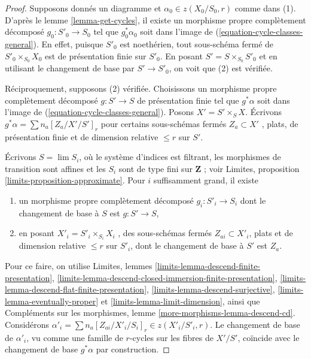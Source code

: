 \begin{proof} 
Supposons donnés un diagramme et $\alpha_0 \in z(X_0/S_0, r)$ comme dans (1). D'après
 le lemme \ref{lemma-get-cycles}, il existe un morphisme propre complètement 
décomposé  $g_0 : S'_0 \to S_0$  tel que $g_0^*\alpha_0$  soit 
dans l'image de (\ref{equation-cycle-classes-general}). En effet, puisque  
$S'_0$ est noethérien, tout sous-schéma fermé de  $S'_0 \times_{S_0} X_0$
  est de présentation finie sur  $S'_0$. En posant  $S' = S \times_{S_0} S'_0$
  et en utilisant le changement de base par $S' \to S'_0$, on voit que (2) est vérifiée. 

\medskip\noindent
 Réciproquement, supposons (2) vérifiée. Choisissons un morphisme propre complètement 
décomposé  $g : S' \to S$  de présentation finie tel que  $g^*\alpha$ soit dans 
l'image de (\ref{equation-cycle-classes-general}). Posons $X' = S' \times_S X$. 
Écrivons $g^*\alpha = \sum n_a [Z_a/X'/S']_r$  pour certains sous-schémas fermés  $Z_a \subset X'$
 , plats, de présentation finie et de dimension relative  
$\leq r$  sur  $S'$. 

\medskip\noindent
 Écrivons $S = \lim S_i$, où le système d'indices est filtrant, les morphismes de transition
 sont affines et les $S_i$ sont de type fini sur $\mathbf{Z}$ 
; voir Limites, proposition \ref{limits-proposition-approximate}.
 Pour $i$ suffisamment grand, il existe 
\begin{enumerate} 
\item un morphisme propre complètement décomposé  $g_i : S'_i \to S_i$
  dont le changement de base à  $S$  est  $g : S' \to S$, 
\item en posant $X'_i = S'_i \times_{S_i} X_i$
 , des sous-schémas fermés $Z_{ai} \subset X'_i$, plats et de
 dimension relative $\leq r$ sur $S'_i$, dont le changement de base à $S'$
 est $Z_a$. 
\end{enumerate} 
Pour ce faire, on utilise Limites, lemmes 
\ref{limits-lemma-descend-finite-presentation}, 
\ref{limits-lemma-descend-closed-immersion-finite-presentation}, 
\ref{limits-lemma-descend-flat-finite-presentation}, 
\ref{limits-lemma-descend-surjective}, 
\ref{limits-lemma-eventually-proper} et 
\ref{limits-lemma-limit-dimension}, ainsi 
que 
Compléments sur les morphismes, lemme 
\ref{more-morphisms-lemma-descend-cd}. 
Considérons $\alpha'_i = \sum n_a [Z_{ai}/X'_i/S_i]_r \in z(X'_i/S'_i, r)$.
 Le changement de base de  $\alpha'_i$, vu comme une famille de  $r$-cycles sur les fibres
 de $X'/S'$, coïncide avec le changement de base $g^*\alpha$ par construction. 


\end{proof}
